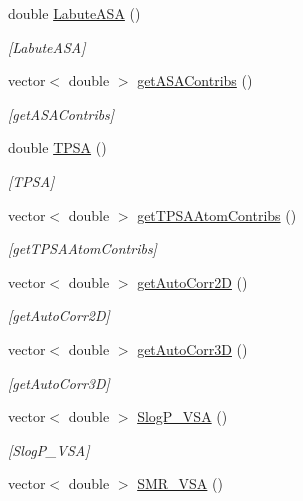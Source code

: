 \begin{DoxyCompactItemize}
double \mbox{\hyperlink{class_molecule_a3ed0d0c3a496259b3e030dcfc2e37e39}{Labute\+A\+SA}} ()
\begin{DoxyCompactList}\small\item\em \mbox{[}Labute\+A\+SA\mbox{]} \end{DoxyCompactList}\item 
vector$<$ double $>$ \mbox{\hyperlink{class_molecule_a6788d32036ced74e382310e93629b785}{get\+A\+S\+A\+Contribs}} ()
\begin{DoxyCompactList}\small\item\em \mbox{[}get\+A\+S\+A\+Contribs\mbox{]} \end{DoxyCompactList}\item 
double \mbox{\hyperlink{class_molecule_ac5e52f33289342df7147a7151890df95}{T\+P\+SA}} ()
\begin{DoxyCompactList}\small\item\em \mbox{[}T\+P\+SA\mbox{]} \end{DoxyCompactList}\item 
vector$<$ double $>$ \mbox{\hyperlink{class_molecule_ab277cc8d75ec0bfafe2e40aa3d960e4b}{get\+T\+P\+S\+A\+Atom\+Contribs}} ()
\begin{DoxyCompactList}\small\item\em \mbox{[}get\+T\+P\+S\+A\+Atom\+Contribs\mbox{]} \end{DoxyCompactList}\item 
vector$<$ double $>$ \mbox{\hyperlink{class_molecule_ae8f8eb2feb22bfb7567d5c4886ef7957}{get\+Auto\+Corr2D}} ()
\begin{DoxyCompactList}\small\item\em \mbox{[}get\+Auto\+Corr2D\mbox{]} \end{DoxyCompactList}\item 
vector$<$ double $>$ \mbox{\hyperlink{class_molecule_a76432450fc78f8e42f7202d58a9b0d09}{get\+Auto\+Corr3D}} ()
\begin{DoxyCompactList}\small\item\em \mbox{[}get\+Auto\+Corr3D\mbox{]} \end{DoxyCompactList}\item 
vector$<$ double $>$ \mbox{\hyperlink{class_molecule_aaf27b23a3849ca9ec2cf2df6ee591244}{Slog\+P\+\_\+\+V\+SA}} ()
\begin{DoxyCompactList}\small\item\em \mbox{[}Slog\+P\+\_\+\+V\+SA\mbox{]} \end{DoxyCompactList}\item 
vector$<$ double $>$ \mbox{\hyperlink{class_molecule_a839c9f1848b3b0c953ca7f4902e86086}{S\+M\+R\+\_\+\+V\+SA}} ()

\end{DoxyCompactItemize}
